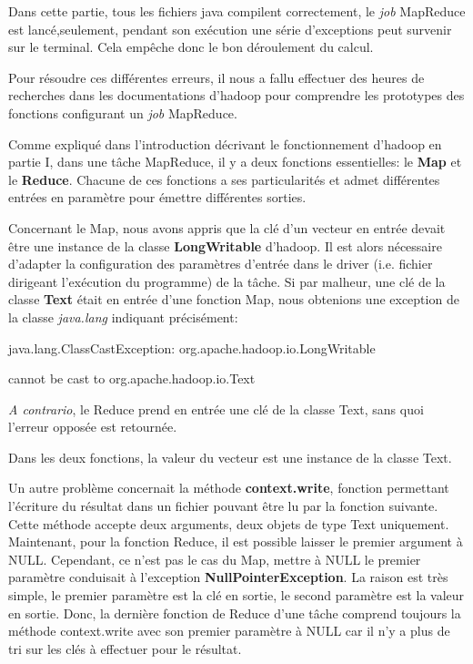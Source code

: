 Dans cette partie, tous les fichiers java compilent correctement, le \textit{job} MapReduce est lancé,seulement, pendant son exécution une série d'exceptions peut survenir sur le terminal. Cela empêche donc le bon déroulement du calcul.\par
Pour résoudre ces différentes erreurs, il nous a fallu effectuer des heures de recherches dans les documentations d'hadoop pour comprendre les prototypes des fonctions configurant un \textit{job} MapReduce.\par
\vspace{1\baselineskip}
Comme expliqué dans l'introduction décrivant le fonctionnement d'hadoop en partie I, dans une tâche MapReduce, il y a deux fonctions essentielles: le \textbf{Map} et le \textbf{Reduce}. Chacune de ces fonctions a ses particularités et admet différentes entrées en paramètre pour émettre différentes sorties.\par
Concernant le Map, nous avons appris que la clé d'un vecteur en entrée devait être une instance de la classe \textbf{LongWritable} d'hadoop. Il est alors nécessaire d'adapter la configuration des paramètres d'entrée dans le driver (i.e. fichier dirigeant l'exécution du programme) de la tâche. Si par malheur, une clé de la classe \textbf{Text} était en entrée d'une fonction Map, nous obtenions une exception de la classe \textit{java.lang} indiquant précisément:\par
\vspace{0.5\baselineskip}

\begin{ttfamily}
java.lang.ClassCastException: org.apache.hadoop.io.LongWritable\par cannot be cast to org.apache.hadoop.io.Text
\end{ttfamily}\par
\vspace{0.5\baselineskip}

\textit{A contrario}, le Reduce prend en entrée une clé de la classe Text, sans quoi l'erreur opposée est retournée.\par
Dans les deux fonctions, la valeur du vecteur est une instance de la classe Text.\par
\vspace{1\baselineskip}

Un autre problème concernait la méthode \textbf{context.write}, fonction permettant l'écriture du résultat dans un fichier pouvant être lu par la fonction suivante. Cette méthode accepte deux arguments, deux objets de type Text uniquement. Maintenant, pour la fonction Reduce, il est possible laisser le premier argument à NULL. Cependant, ce n'est pas le cas du Map, mettre à NULL le premier paramètre conduisait à l'exception \textbf{NullPointerException}. La raison est très simple, le premier paramètre est la clé en sortie, le second paramètre est la valeur en sortie. Donc, la dernière fonction de Reduce d'une tâche comprend toujours la méthode context.write avec son premier paramètre à NULL car il n'y a plus de tri sur les clés à effectuer pour le résultat.
\vspace{1.5\baselineskip}

